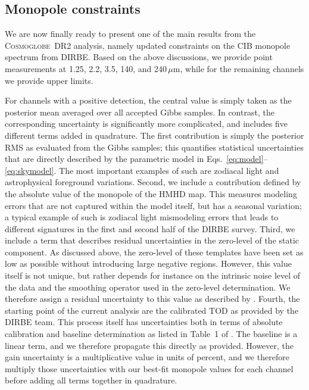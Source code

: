 \documentclass{aa}
\newcommand{\cosmoglobe}{\textsc{Cosmoglobe}}
\begin{document}
\subsection{Monopole constraints}

We are now finally ready to present one of the main results from the
\cosmoglobe\ DR2 analysis, namely updated constraints on the CIB
monopole spectrum from DIRBE. Based on the above discussions, we
provide point measurements at 1.25, 2.2, 3.5, 140, and
240$\,\mu\mathrm{m}$, while for the remaining channels we provide
upper limits.

For channels with a positive detection, the central value is simply
taken as the posterior mean averaged over all accepted Gibbs
samples. In contrast, the corresponding uncertainty is significantly
more complicated, and includes five different terms added in
quadrature. The first contribution is simply the posterior
RMS as evaluated from the Gibbs samples; this quantifies statistical
uncertainties that are directly described by the parametric model in
Eqs.~\eqref{eq:model}--\eqref{eq:skymodel}. The most important
examples of such are zodiacal light and astrophysical foreground
variations. Second, we include a contribution defined by the
absolute value of the monopole of the HMHD map. This measures
modeling errors that are not captured within the model itself, but
has a seasonal variation; a typical example of such is zodiacal light
mismodeling errors that leads to different signatures in the first
and second half of the DIRBE survey. Third, we include a term that
describes residual uncertainties in the zero-level of the static
component. As discussed above, the zero-level of these templates have
been set as low as possible without introducing large negative
regions. However, this value itself is not unique, but rather depends
for instance on the intrinsic noise level of the data and the
smoothing operator used in the zero-level determination. We therefore
assign a residual uncertainty to this value as described by
\citet{CG02_01}. Fourth, the starting point of the current analysis
are the calibrated TOD as provided by the DIRBE team. This process
itself has uncertainties both in terms of absolute calibration and
baseline determination as listed in Table~1 of \citet{hauser1998}. The
baseline is a linear term, and we therefore propagate this directly as
provided. However, the gain uncertainty is a multiplicative value in
units of percent, and we therefore multiply those uncertainties with
our best-fit monopole values for each channel before adding
all terms together in quadrature.
\end{document}

